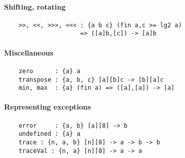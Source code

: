 \paragraph*{Shifting, rotating}
\begin{Verbatim}
    >>, <<, >>>, <<< : {a b c} (fin a,c >= lg2 a) 
                     => ([a]b,[c]) -> [a]b
\end{Verbatim}
\paragraph*{Miscellaneous}
\begin{Verbatim}
    zero      : {a} a
    transpose : {a, b, c} [a][b]c -> [b][a]c
    min, max  : {a} (fin a) => ([a],[a]) -> [a]
\end{Verbatim}
\paragraph*{Representing exceptions}
\begin{Verbatim}
    error     : {a, b} [a][8] -> b
    undefined : {a} a
    trace : {n, a, b} [n][8] -> a -> b -> b
    traceVal : {n, a} [n][8] -> a -> a
\end{Verbatim}


